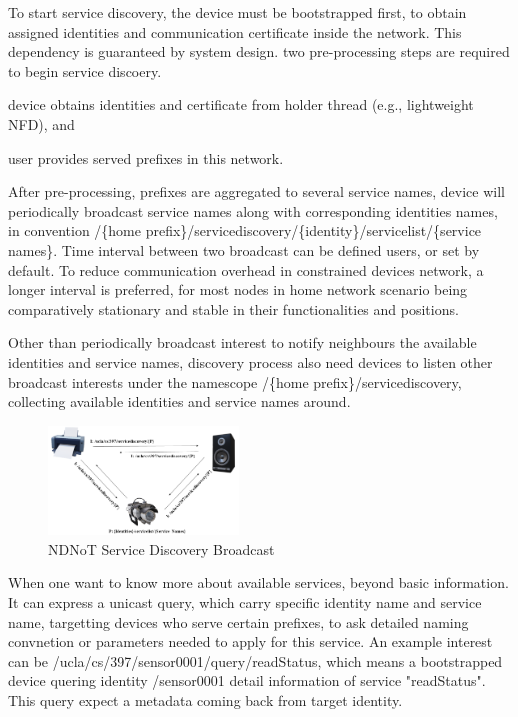 \documentclass[sigconf]{acmart}
\begin{document}
To start service discovery, the device must be bootstrapped first, to obtain assigned identities and communication certificate inside the network.
This dependency is guaranteed by system design. two pre-processing steps are required to begin service discoery. 
\begin{enumerate*} [label=(\roman*)]
	\item device obtains identities and certificate from holder thread (e.g., lightweight NFD),
	and
	\item user provides served prefixes in this network.
\end{enumerate*}

After pre-processing, prefixes are aggregated to several service names, device will periodically broadcast service names 
along with corresponding identities names, in convention /\{home prefix\}/servicediscovery/\{identity\}/servicelist/\{service names\}. 
Time interval between two broadcast can be defined users, or set by default. To reduce communication overhead in constrained devices network, 
a longer interval is preferred, for most nodes in home network scenario being comparatively stationary and stable in their functionalities and positions.  

Other than periodically broadcast interest to notify neighbours the available identities and service names, discovery process also need devices
to listen other broadcast interests under the namescope /\{home prefix\}/servicediscovery, collecting available identities and service names around.

\begin{figure}[h]
	\vspace{-0.1cm}
	\centering
	\includegraphics[width=0.45\textwidth]{figures/service-discovery}
	\caption{NDNoT Service Discovery Broadcast}
	\vspace{-0.1cm}
	\label{fig:servicediscovery-broadcast}
\end{figure}

When one want to know more about available services, beyond basic information. It can express a unicast query, which carry specific identity name and service name, 
targetting devices who serve certain prefixes, to ask detailed naming convnetion or parameters needed to apply for this service. An example interest can be 
/ucla/cs/397/sensor0001/query/readStatus, which means a bootstrapped device quering identity /sensor0001 detail information of service "readStatus". This query expect 
a metadata coming back from target identity.
\end{document}
